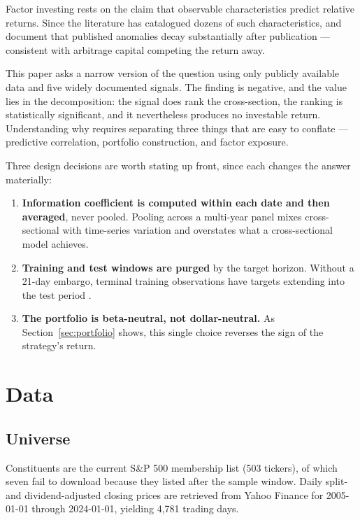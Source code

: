 \documentclass[11pt]{article}
\begin{document}
Factor investing rests on the claim that observable characteristics predict
relative returns. Since \citet{fama1993} the literature has catalogued dozens of
such characteristics, and \citet{mclean2016} document that published anomalies
decay substantially after publication --- consistent with arbitrage capital
competing the return away.

This paper asks a narrow version of the question using only publicly available
data and five widely documented signals. The finding is negative, and the value
lies in the decomposition: the signal does rank the cross-section, the ranking
is statistically significant, and it nevertheless produces no investable return.
Understanding why requires separating three things that are easy to conflate ---
predictive correlation, portfolio construction, and factor exposure.

Three design decisions are worth stating up front, since each changes the answer
materially:

\begin{enumerate}
\item \textbf{Information coefficient is computed within each date and then
averaged}, never pooled. Pooling across a multi-year panel mixes cross-sectional
with time-series variation and overstates what a cross-sectional model achieves.
\item \textbf{Training and test windows are purged} by the target horizon.
Without a 21-day embargo, terminal training observations have targets extending
into the test period \citep{lopezdeprado2018}.
\item \textbf{The portfolio is beta-neutral, not dollar-neutral.} As
Section~\ref{sec:portfolio} shows, this single choice reverses the sign of the
strategy's return.
\end{enumerate}

\section{Data}

\subsection{Universe}

Constituents are the current S\&P 500 membership list (503 tickers), of which
seven fail to download because they listed after the sample window. Daily
split- and dividend-adjusted closing prices are retrieved from Yahoo Finance for
2005-01-01 through 2024-01-01, yielding 4{,}781 trading days.
\end{document}
